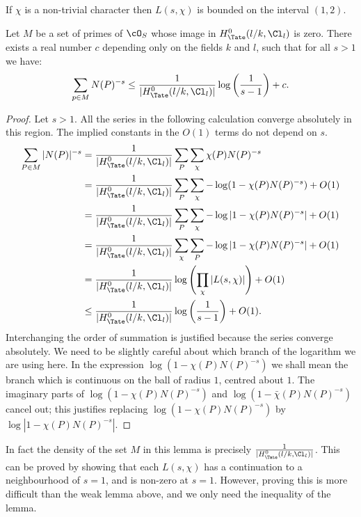 \begin{lemma} \label{lem:L-function bound}
	If $\chi$ is a non-trivial character then $L(s,\chi)$ is
	bounded on the interval $(1,2)$.
\end{lemma}

\begin{lemma} \label{lem:density bound}
	Let $M$ be a set of primes of $\cO_S$ whose image in $H^0_{\Tate}(l/k,\Cl_l)$ is zero.
	There exists a real number $c$ depending only on the fields $k$ and $l$,
	such that for all $s > 1$ we have:
	\[
		\sum_{p \in M} N(P)^{-s}
		\le \frac{1}{|H^0_{\Tate}(l/k,\Cl_l)|} \log\left(\frac{1}{s-1}\right) + c.
	\]
\end{lemma}


\begin{proof}
	Let $s > 1$. All the series in the following calculation converge absolutely in this region.
	The implied constants in the $O(1)$ terms do not depend on $s$.
	\begin{align*}
		\sum_{P \in M} |N(P)|^{-s}
		&= \frac{1}{|H^0_{\Tate}(l/k,\Cl_l)|} \sum_P \sum_\chi \chi(P) N(P)^{-s}\\
		&= \frac{1}{|H^0_{\Tate}(l/k,\Cl_l)|}
		\sum_P \sum_\chi -\log(1-\chi(P) N(P)^{-s}) + O(1)\\
		&= \frac{1}{|H^0_{\Tate}(l/k,\Cl_l)|}
		\sum_P \sum_\chi -\log |1-\chi(P) N(P)^{-s}| + O(1)\\
		&= \frac{1}{|H^0_{\Tate}(l/k,\Cl_l)|}
		\sum_\chi \sum_P -\log |1-\chi(P) N(P)^{-s}| + O(1)\\
		&= \frac{1}{|H^0_{\Tate}(l/k,\Cl_l)|} \log \left(\prod_\chi |L(s,\chi)| \right) + O(1)\\
		&\le \frac{1}{|H^0_{\Tate}(l/k,\Cl_l)|} \log \left(\frac{1}{s-1}\right) + O(1).
	\end{align*}
	Interchanging the order of summation is justified because the series converge absolutely.
	We need to be slightly careful about which branch of the logarithm we are using here.
	In the expression $\log(1-\chi(P) N(P)^{-s})$ we shall mean the branch which is continuous
	on the ball of radius $1$, centred about $1$.
	The imaginary parts of $\log(1-\chi(P) N(P)^{-s})$ and $\log(1-\bar \chi(P) N(P)^{-s})$
	cancel out; this justifies replacing $\log(1-\chi(P) N(P)^{-s})$ by $\log |1-\chi(P) N(P)^{-s}|$.
\end{proof}

\begin{remark}
	In fact the density of the set $M$ in this lemma is precisely $\frac{1}{|H^0_{\Tate}(l/k,\Cl_l)|}$.
	This can be proved by showing that each $L(s,\chi)$ has a continuation to a neighbourhood
	of $s=1$, and is non-zero at $s=1$.
	However, proving this is more difficult than the weak lemma above, and we only need the inequality
	of the lemma.
\end{remark}






